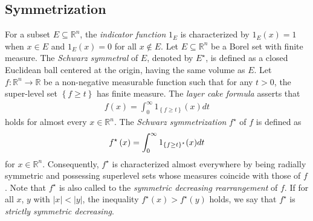 \documentclass[preprint,12pt]{elsarticle}
\begin{document}
\subsection{Symmetrization}
For a subset $E\subseteq \mathbb{R}^n$, the {\it indicator function} $1_{E}$ is characterized by $1_{E}\left ( x \right )=1$ when $x\in E$ and $1_{E}\left ( x \right )=0$ for all $x\notin E$. Let $E\subseteq \mathbb{R}^n$ be a Borel set with finite measure. The {\it Schwarz symmetral} of $E$, denoted by $E^{\star}$, is defined as a closed Euclidean ball centered at the origin, having the same volume as $E$.
Let $f:\mathbb{R}^n \to \mathbb{R}$ be a non-negative measurable function such that for any $t > 0$, the super-level set $\left \{f \ge t \right \}$ has finite measure. The {\it layer cake formula} asserts that 
\begin{eqnarray}\label{2c}
	f\left ( x \right )=\int_{0}^{\infty }1_{\left \{ f\ge t \right \} }\left ( x \right )dt
\end{eqnarray}
holds for almost every $x \in \mathbb{R}^n$. The {\it Schwarz symmetrization} $f^{\star}$ of $f$ is defined as 
\begin{eqnarray}
	f^{\star }\left ( x \right )=\int_{0}^{\infty }1_{\left \{ f\ge t \right \}^{\star }  }(x)dt   \notag
\end{eqnarray}
for $x \in \mathbb{R}^n$. Consequently, $f^{\star}$ is characterized almost everywhere by being radially symmetric and possessing superlevel sets whose measures coincide with those of $f$. Note that $f^{\star }$ is also called to the {\it symmetric decreasing rearrangement} of $f$. If for all $x$, $y$ with $|x|<|y|$, the inequality $f^{\star }(x)>f^{\star }(y)$ holds, we say that $f^{\star }$ is {\it strictly symmetric decreasing}.
\end{document}

